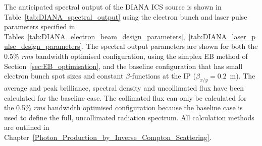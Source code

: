 \documentclass[../main.tex]{subfiles}
\begin{document}
The anticipated spectral output of the DIANA ICS source is shown in Table~\ref{tab:DIANA_spectral_output} using the electron bunch and laser pulse parameters specified in Tables~\ref{tab:DIANA_electron_beam_design_parameters},~\ref{tab:DIANA_laser_pulse_design_parameters}. The spectral output parameters are shown for both the 0.5\% \textit{rms} bandwidth optimised configuration, using the simplex EB method of Section~\ref{sec:EB_optimisation}, and the baseline configuration that has small electron bunch spot sizes and constant $\beta$-functions at the IP ($\beta_{x/y}=0.2$~\si{\meter}). The average and peak brilliance, spectral density and uncollimated flux have been calculated for the baseline case. The collimated flux can only be calculated for the 0.5\% \textit{rms} bandwidth optimised configuration because the baseline case is used to define the full, uncollimated radiation spectrum. All calculation methods are outlined in Chapter~\ref{Photon_Production_by_Inverse_Compton_Scattering}. 
\end{document}

